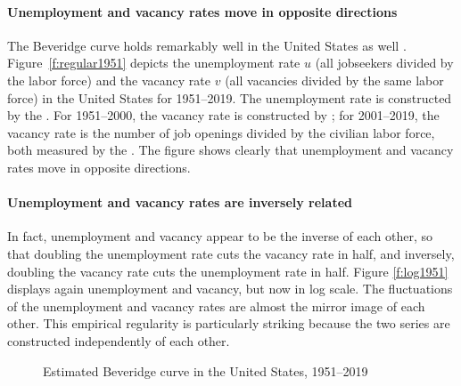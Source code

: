 \documentclass[letterpaper,12pt,leqno]{article}
\newcommand{\pdf}{../../figures/xsquareroot_202206.pdf}
\begin{document}
\paragraph{Unemployment and vacancy rates move in opposite directions} The Beveridge curve holds remarkably well in the United States as well \citep{BD89,EMR15}. Figure~\ref{f:regular1951} depicts the unemployment rate $u$ (all jobseekers divided by the labor force) and the vacancy rate $v$ (all vacancies divided by the same labor force) in the United States for 1951--2019. The unemployment rate is constructed by the \citet{UNRATE}. For 1951--2000, the vacancy rate is constructed by \citet{B10d}; for 2001--2019, the vacancy rate is the number of job openings divided by the civilian labor force, both measured by the \citet{CLF16OV,JTSJOL}. The figure shows clearly that unemployment and vacancy rates move in opposite directions. 

\paragraph{Unemployment and vacancy rates are inversely related} In fact, unemployment and vacancy appear to be the inverse of each other, so that doubling the unemployment rate cuts the vacancy rate in half, and inversely, doubling the vacancy rate cuts the unemployment rate in half. Figure \ref{f:log1951} displays again unemployment and vacancy, but now in log scale. The fluctuations of the unemployment and vacancy rates are almost the mirror image of each other. This empirical regularity is particularly striking because the two series are constructed independently of each other.

\begin{figure}[p]
\hfill
{}\vfig
{}\hfill
{}\vfig
{}\hfill
{}
\caption{Estimated Beveridge curve in the United States, 1951--2019}
\label{f:hyperbola}\end{figure}
\end{document}
